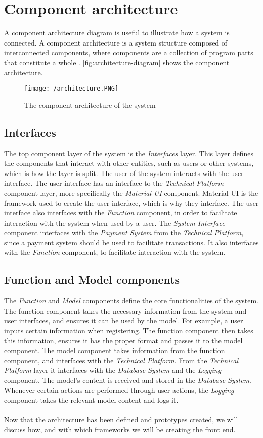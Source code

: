 \section{Component architecture}
A component architecture diagram is useful to illustrate how a system is connected.
A component architecture is a system structure composed of interconnected components, where components are a collection of program parts that constitute a whole \cite{OOAD}.
\autoref{fig:architecture-diagram} shows the component architecture.

\begin{figure}[]
    \texttt{[image: /architecture.PNG]}
    \caption{The component architecture of the system}
    \label{fig:architecture-diagram}
\end{figure}

\subsection{Interfaces}
The top component layer of the system is the \textit{Interfaces} layer.
This layer defines the components that interact with other entities, such as users or other systems, which is how the layer is split.
The user of the system interacts with the user interface.
The user interface has an interface to the \textit{Technical Platform} component layer, more specifically the \textit{Material UI} component.
Material UI is the framework used to create the user interface, which is why they interface.
The user interface also interfaces with the \textit{Function} component, in order to facilitate interaction with the system when used by a user. 
The \textit{System Interface} component interfaces with the \textit{Payment System} from the \textit{Technical Platform}, since a payment system should be used to facilitate transactions.
It also interfaces with the \textit{Function} component, to facilitate interaction with the system.

\subsection{Function and Model components}
The \textit{Function} and \textit{Model} components define the core functionalities of the system.
The function component takes the necessary information from the system and user interfaces, and ensures it can be used by the model.
For example, a user inputs certain information when registering. 
The function component then takes this information, ensures it has the proper format and passes it to the model component.
The model component takes information from the function component, and interfaces with the \textit{Technical Platform}.
From the \textit{Technical Platform} layer it interfaces with the \textit{Database System} and the \textit{Logging} component.
The model's content is received and stored in the \textit{Database System}.
Whenever certain actions are performed through user actions, the \textit{Logging} component takes the relevant model content and logs it.
\\\\
Now that the architecture has been defined and prototypes created, we will discuss how, and with which frameworks we will be creating the front end.

